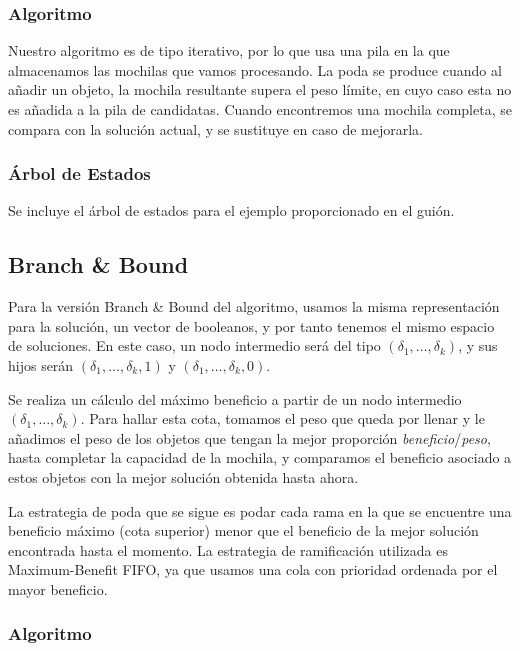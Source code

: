 \documentclass[a4paper, 11pt]{article} %
\begin{document}
	\subsubsection{Algoritmo}
	  Nuestro algoritmo es de tipo iterativo, por lo que usa una pila en la que almacenamos las mochilas que 
	  vamos procesando. La poda se produce cuando al añadir un objeto, la mochila resultante supera el peso 
	  límite, en cuyo caso esta no es añadida a la pila de candidatas. Cuando encontremos una mochila completa, 
	  se compara con la solución actual, y se sustituye en caso de mejorarla. 
    
	  \small
	    \texttt{}
	  \normalsize
	  
	\subsubsection{Árbol de Estados}
	Se incluye el árbol de estados para el ejemplo proporcionado en el guión. 
	 \tiny
	   	\texttt{}
	 \normalsize
    
    
	\subsection{Branch \& Bound}
	  Para la versión Branch \& Bound del algoritmo, usamos la misma representación para la solución, 
	  un vector de booleanos, y por tanto tenemos el mismo espacio de soluciones. En este caso, un nodo 
	  intermedio será del tipo $(\delta_1, \dots, \delta_k)$, y sus hijos serán $(\delta_1, \dots, \delta_k, 1)$ 
	  y $(\delta_1, \dots, \delta_k, 0)$.
	  
	  Se realiza un cálculo del máximo beneficio a partir de un nodo intermedio $(\delta_1, \dots, \delta_k)$. 
	  Para hallar esta cota, tomamos el peso que queda por llenar y le añadimos el peso de los objetos que tengan
	  la mejor proporción \textit{beneficio}/\textit{peso}, hasta completar la capacidad de la mochila, y comparamos
	  el beneficio asociado a estos objetos con la mejor solución obtenida hasta ahora.
	  
	  La estrategia de poda que se sigue es podar cada rama en la que se encuentre una beneficio máximo (cota superior) 
	  menor que el beneficio de la mejor solución encontrada hasta el momento. La estrategia de ramificación utilizada es 
	  Maximum-Benefit FIFO, ya que usamos una cola con prioridad ordenada por el mayor beneficio.
      
	  \subsubsection{Algoritmo}
	    
\end{document}
